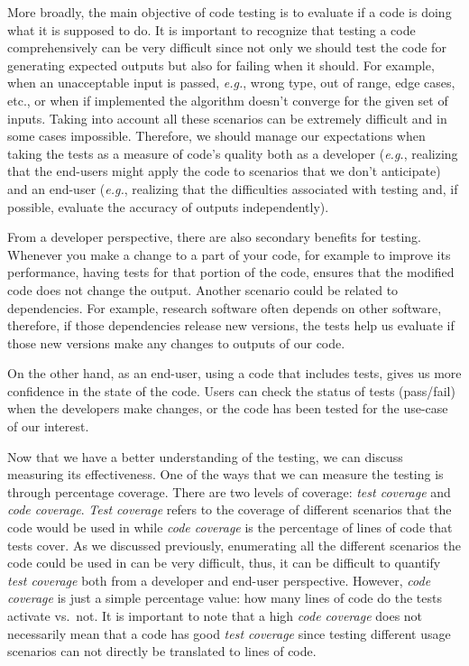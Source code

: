 \documentclass[
  letterpaper,
  DIV=11,
  numbers=noendperiod]{scrreport}
\begin{document}
More broadly, the main objective of code testing is to evaluate if a
code is doing what it is supposed to do. It is important to recognize
that testing a code comprehensively can be very difficult since not only
we should test the code for generating expected outputs but also for
failing when it should. For example, when an unacceptable input is
passed, \emph{e.g.}, wrong type, out of range, edge cases, etc., or when
if implemented the algorithm doesn't converge for the given set of
inputs. Taking into account all these scenarios can be extremely
difficult and in some cases impossible. Therefore, we should manage our
expectations when taking the tests as a measure of code's quality both
as a developer (\emph{e.g.}, realizing that the end-users might apply
the code to scenarios that we don't anticipate) and an end-user
(\emph{e.g.}, realizing that the difficulties associated with testing
and, if possible, evaluate the accuracy of outputs independently).

From a developer perspective, there are also secondary benefits for
testing. Whenever you make a change to a part of your code, for example
to improve its performance, having tests for that portion of the code,
ensures that the modified code does not change the output. Another
scenario could be related to dependencies. For example, research
software often depends on other software, therefore, if those
dependencies release new versions, the tests help us evaluate if those
new versions make any changes to outputs of our code.

On the other hand, as an end-user, using a code that includes tests,
gives us more confidence in the state of the code. Users can check the
status of tests (pass/fail) when the developers make changes, or the
code has been tested for the use-case of our interest.

Now that we have a better understanding of the testing, we can discuss
measuring its effectiveness. One of the ways that we can measure the
testing is through percentage coverage. There are two levels of
coverage: \emph{test coverage} and \emph{code coverage}. \emph{Test
coverage} refers to the coverage of different scenarios that the code
would be used in while \emph{code coverage} is the percentage of lines
of code that tests cover. As we discussed previously, enumerating all
the different scenarios the code could be used in can be very difficult,
thus, it can be difficult to quantify \emph{test coverage} both from a
developer and end-user perspective. However, \emph{code coverage} is
just a simple percentage value: how many lines of code do the tests
activate vs.~not. It is important to note that a high \emph{code
coverage} does not necessarily mean that a code has good \emph{test
coverage} since testing different usage scenarios can not directly be
translated to lines of code.
\end{document}
